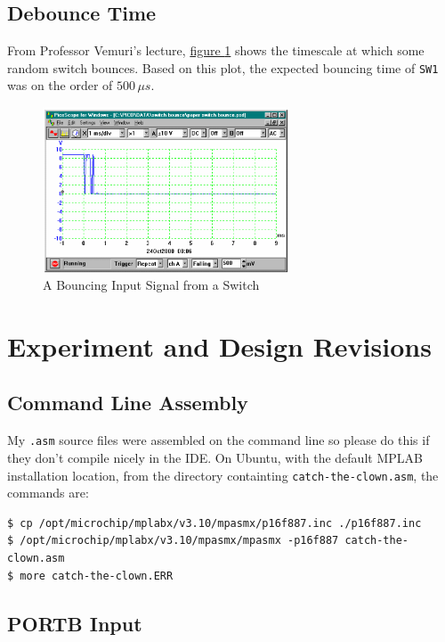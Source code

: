 \documentclass[11pt]{article}
\begin{document}
\subsection{Debounce Time}

From Professor Vemuri's lecture,
\hyperref[debounce-handout-time-graph]{figure \ref{debounce-handout-time-graph}}
shows the timescale at which some random switch bounces.
Based on this plot, the expected bouncing time of \texttt{SW1}
was on the order of $500\, \mu s$.

\begin{figure}
	\centering
	\includegraphics[width=0.65\textwidth]{Figures/debounce-handout-time-graph.pdf}
	\caption{A Bouncing Input Signal from a Switch}
	\label{debounce-handout-time-graph}
\end{figure}

\section{Experiment and Design Revisions}

\subsection{Command Line Assembly}

My \texttt{.asm} source files were assembled on the command line so
please do this if they don't compile nicely in the IDE.
On Ubuntu, with the default MPLAB installation location, 
from the directory containting \texttt{catch-the-clown.asm}, the commands are:
\begin{verbatim}
$ cp /opt/microchip/mplabx/v3.10/mpasmx/p16f887.inc ./p16f887.inc
$ /opt/microchip/mplabx/v3.10/mpasmx/mpasmx -p16f887 catch-the-clown.asm
$ more catch-the-clown.ERR
\end{verbatim}

\subsection{PORTB Input}
\end{document}
